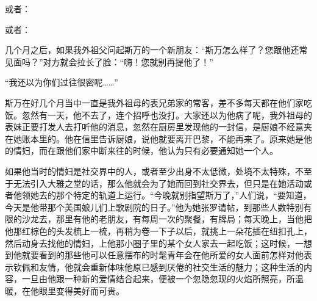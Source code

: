 \par 或者：
\par 或者：
\par 几个月之后，如果我外祖父问起斯万的一个新朋友：“斯万怎么样了？您跟他还常见面吗？”对方就会拉长了脸：“嗨！您就别再提他了！”
\par “我还以为你们过往很密呢……”
\par 斯万在好几个月当中一直是我外祖母的表兄弟家的常客，差不多每天都在他们家吃饭。忽然有一天，他不去了，连个招呼也没打。大家还以为他病了呢，我外祖母的表妹正要打发人去打听他的消息，忽然在厨房里发现他的一封信，是厨娘不经意夹在她账本里的。他在信里告诉厨娘，说他就要离开巴黎，不能再来了。原来她是他的情妇，而在跟他们家中断来往的时候，他认为只有必要通知她一个人。
\par 如果他当时的情妇是社交界中的人，或者至少出身不太低微，处境不太特殊，不至于无法引入大雅之堂的话，那么他就会为了她而回到社交界去，但只是在她活动或者他领她去的那个特定的轨道上运行。“今晚就别指望斯万了，”人们说，“要知道，今天是他带那个美国娘儿们上歌剧院的日子。”他为她张罗请帖，到那些人数特别有限的沙龙去，那里有他的老朋友，有每周一次的聚餐，有牌局；每天晚上，当他把他那红棕色的头发梳上一梳，再稍为卷一下子以后，就挑上一朵花插在纽扣孔上，然后动身去找他的情妇，上他那小圈子里的某个女人家去一起吃饭；这时候，一想到他就要看到的那些他可以任意摆布的时髦青年会在他所爱的女人面前怎样对他表示钦佩和友情，他就会重新体味他原已感到厌倦的社交生活的魅力；这种生活的内容，一旦由他跟一种新的爱情结合起来，便被一个忽隐忽现的火焰所照亮，所温暖，在他眼里变得美好而可贵。
